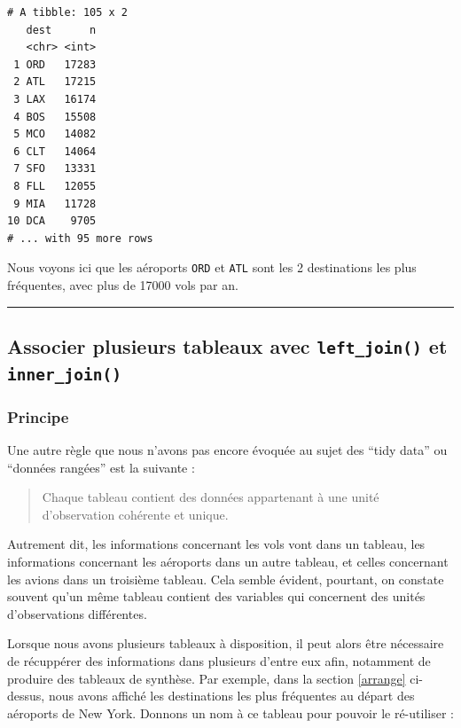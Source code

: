 \documentclass[
  a4paper,
]{article}
\begin{document}
\begin{verbatim}
# A tibble: 105 x 2
   dest      n
   <chr> <int>
 1 ORD   17283
 2 ATL   17215
 3 LAX   16174
 4 BOS   15508
 5 MCO   14082
 6 CLT   14064
 7 SFO   13331
 8 FLL   12055
 9 MIA   11728
10 DCA    9705
# ... with 95 more rows
\end{verbatim}

Nous voyons ici que les aéroports \texttt{ORD} et \texttt{ATL} sont les 2 destinations les plus fréquentes, avec plus de 17000 vols par an.

\begin{center}\rule{0.5\linewidth}{0.5pt}\end{center}

\hypertarget{associer-plusieurs-tableaux-avec-left_join-et-inner_join}{%
\subsection{\texorpdfstring{Associer plusieurs tableaux avec \texttt{left\_join()} et \texttt{inner\_join()}}{Associer plusieurs tableaux avec left\_join() et inner\_join()}}\label{associer-plusieurs-tableaux-avec-left_join-et-inner_join}}

\hypertarget{principe-2}{%
\subsubsection{Principe}\label{principe-2}}

Une autre règle que nous n'avons pas encore évoquée au sujet des ``tidy data'' ou ``données rangées'' est la suivante :

\begin{quote}
Chaque tableau contient des données appartenant à une unité d'observation cohérente et unique.
\end{quote}

Autrement dit, les informations concernant les vols vont dans un tableau, les informations concernant les aéroports dans un autre tableau, et celles concernant les avions dans un troisième tableau. Cela semble évident, pourtant, on constate souvent qu'un même tableau contient des variables qui concernent des unités d'observations différentes.

Lorsque nous avons plusieurs tableaux à disposition, il peut alors être nécessaire de récuppérer des informations dans plusieurs d'entre eux afin, notamment de produire des tableaux de synthèse. Par exemple, dans la section \ref{arrange} ci-dessus, nous avons affiché les destinations les plus fréquentes au départ des aéroports de New York. Donnons un nom à ce tableau pour pouvoir le ré-utiliser :
\end{document}

